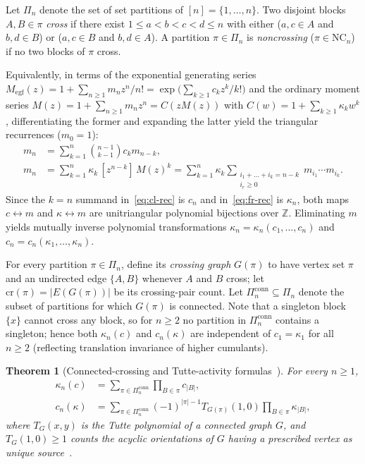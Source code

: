 \documentclass[11pt,a4paper]{article}
\newtheorem{theorem}{Theorem}[section]
\theoremstyle{definition}
\theoremstyle{remark}
\newcommand{\NC}{\mathrm{NC}}
\newcommand{\conn}{\mathrm{conn}}
\newcommand{\crpair}{\mathrm{cr}}
\newcommand{\Z}{\mathbb{Z}}
\begin{document}
Let $\Pi_n$ denote the set of set partitions of $[n] = \{1,\dots,n\}$. Two disjoint blocks $A,B \in \pi$ \emph{cross} if there exist $1 \le a < b < c < d \le n$ with either ($a,c \in A$ and $b,d \in B$) or ($a,c \in B$ and $b,d \in A$). A partition $\pi \in \Pi_n$ is \emph{noncrossing} ($\pi \in \NC_n$) if no two blocks of $\pi$ cross.

Equivalently, in terms of the exponential generating series $M_{\mathrm{egf}}(z) = 1 + \sum_{n \ge 1} m_n z^n / n! = \exp\bigl(\sum_{k \ge 1} c_k z^k / k!\bigr)$ and the ordinary moment series $M(z) = 1 + \sum_{n \ge 1} m_n z^n = C(z M(z))$ with $C(w) = 1 + \sum_{k \ge 1} \kappa_k w^k$, differentiating the former and expanding the latter yield the triangular recurrences ($m_0 = 1$):
\begin{align}
  m_n &= \sum_{k=1}^{n} \binom{n-1}{k-1} c_k m_{n-k}, \label{eq:cl-rec}\\
  m_n &= \sum_{k=1}^{n} \kappa_k \,[z^{n-k}]\, M(z)^k
       = \sum_{k=1}^{n} \kappa_k \sum_{\substack{i_1+\dots+i_k = n-k \\ i_r \ge 0}} m_{i_1}\cdots m_{i_k}. \label{eq:fr-rec}
\end{align}
Since the $k = n$ summand in~\eqref{eq:cl-rec} is $c_n$ and in~\eqref{eq:fr-rec} is $\kappa_n$, both maps $c \leftrightarrow m$ and $\kappa \leftrightarrow m$ are unitriangular polynomial bijections over $\Z$. Eliminating $m$ yields mutually inverse polynomial transformations $\kappa_n = \kappa_n(c_1,\dots,c_n)$ and $c_n = c_n(\kappa_1,\dots,\kappa_n)$.

For every partition $\pi \in \Pi_n$, define its \emph{crossing graph} $G(\pi)$ to have vertex set $\pi$ and an undirected edge $\{A,B\}$ whenever $A$ and $B$ cross; let $\crpair(\pi) = |E(G(\pi))|$ be its crossing-pair count. Let $\Pi_n^{\conn} \subseteq \Pi_n$ denote the subset of partitions for which $G(\pi)$ is connected. Note that a singleton block $\{x\}$ cannot cross any block, so for $n \ge 2$ no partition in $\Pi_n^{\conn}$ contains a singleton; hence both $\kappa_n(c)$ and $c_n(\kappa)$ are independent of $c_1 = \kappa_1$ for all $n \ge 2$ (reflecting translation invariance of higher cumulants).

\begin{theorem}[Connected-crossing and Tutte-activity formulas~\cite{Lehner2002,BBLS2011,JosuatVerges2013,AHLV2015}]\label{thm:conn-tutte}
For every $n \ge 1$,
\begin{align}
  \kappa_n(c) &= \sum_{\pi \in \Pi_n^{\conn}} \prod_{B \in \pi} c_{|B|}, \label{eq:lehner}\\
  c_n(\kappa) &= \sum_{\pi \in \Pi_n^{\conn}} (-1)^{|\pi|-1} T_{G(\pi)}(1,0) \prod_{B \in \pi} \kappa_{|B|}, \label{eq:ahlv}
\end{align}
where $T_G(x,y)$ is the Tutte polynomial of a connected graph $G$, and $T_G(1,0) \ge 1$ counts the acyclic orientations of $G$ having a prescribed vertex as unique source~\cite{GreeneZaslavsky1983}.
\end{theorem}
\end{document}
